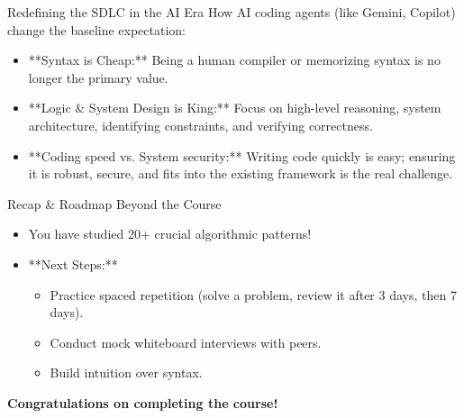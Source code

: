 \begin{frame}{Redefining the SDLC in the AI Era}
  How AI coding agents (like Gemini, Copilot) change the baseline expectation:
  \begin{itemize}
    \item **Syntax is Cheap:** Being a human compiler or memorizing syntax is no longer the primary value.
    \item **Logic \& System Design is King:** Focus on high-level reasoning, system architecture, identifying constraints, and verifying correctness.
    \item **Coding speed vs. System security:** Writing code quickly is easy; ensuring it is robust, secure, and fits into the existing framework is the real challenge.
  \end{itemize}
\end{frame}

\begin{frame}{Recap \& Roadmap Beyond the Course}
  \begin{itemize}
    \item You have studied 20+ crucial algorithmic patterns!
    \item **Next Steps:**
      \begin{itemize}
        \item Practice spaced repetition (solve a problem, review it after 3 days, then 7 days).
        \item Conduct mock whiteboard interviews with peers.
        \item Build intuition over syntax.
      \end{itemize}
  \end{itemize}
  \centering
  \vspace{0.5cm}
  \textbf{Congratulations on completing the course!}
\end{frame}
